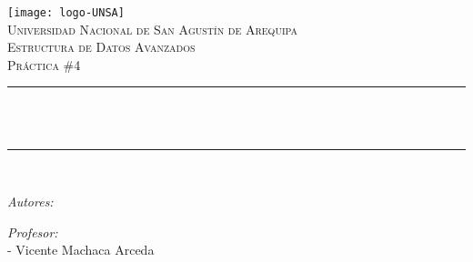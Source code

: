 \begin{titlepage}

\centering
\texttt{[image: logo-UNSA]}\\[1.0 cm]
\textsc{\LARGE Universidad Nacional de San Agustín de Arequipa}\\[2.0 cm]
\textsc{\Large Estructura de Datos Avanzados}\\[0.5 cm]
\textsc{\large Práctica \#4}\\[0.5 cm]
\rule{\linewidth}{0.2 mm} \\[0.4 cm]
{ \huge \bfseries \thetitle}\\
\rule{\linewidth}{0.2 mm} \\[1.5 cm]

\begin{flushleft} \large
  \emph{Autores:}\\
\theauthor
\end{flushleft}

\begin{flushleft} \large
  \emph{Profesor:}\\
  - Vicente Machaca Arceda \\
\end{flushleft}

\vfill

{\large \thedate}

\end{titlepage}

